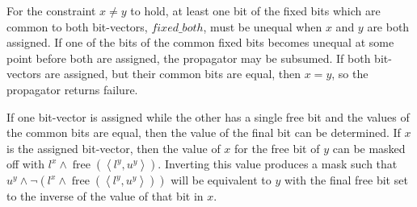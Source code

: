 \documentclass[a4paper,10pt,twoside,openright]{book}
\newcommand{\tuple}[1]{\left\langle #1\right\rangle}
\DeclareMathOperator{\free}{free}
\begin{document}
For the constraint $x \neq y$ to hold,
at least one bit of the fixed bits which are common to both bit-vectors, $\mathit{fixed\_both}$,
must be unequal when $x$ and $y$ are both assigned.
If one of the bits of the common fixed bits becomes unequal at some point
before both are assigned, the propagator may be subsumed.
If both bit-vectors are assigned, 
but their common bits are equal, 
then $x = y$, so the propagator returns failure.

If one bit-vector is assigned while the other has a single free bit and
the values of the common bits are equal,
then the value of the final bit can be determined.
If $x$ is the assigned bit-vector, 
then the value of $x$ for the free bit of $y$ 
can be masked off with
$l^x \land \free(\tuple{l^y,u^y})$.
Inverting this value produces a mask such that 
$u^y \land \lnot (l^x \land \free(\tuple{l^y,u^y}))$
will be equivalent to $y$ with the final free bit 
set to the inverse of the value of that bit in $x$.
\end{document}
